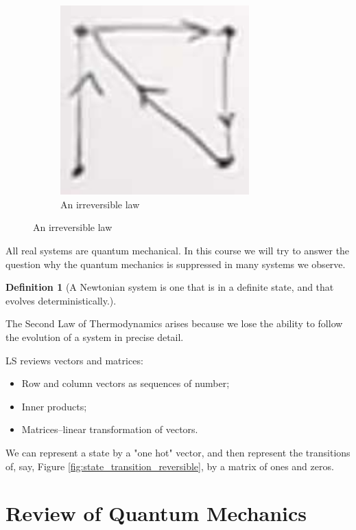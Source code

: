 \documentclass[]{article}
\newtheorem{defn}[thm]{Definition}
\begin{document}
\begin{figure}[H]
\begin{subfigure}[t]{0.45\textwidth}
	\end{subfigure}
	\begin{subfigure}[t]{0.45\textwidth}
		\caption{An irreversible law}
		\includegraphics[width=0.8\textwidth]{et-1-2}
	\end{subfigure}
\end{figure}

All real systems are quantum mechanical. In this course we will try to answer the question why the quantum mechanics is suppressed in many systems we observe.

\begin{defn}[A Newtonian system is one that is in a definite state, and that evolves deterministically.]
\end{defn}

The Second Law of Thermodynamics arises because we lose the ability to follow the evolution of a system in precise detail.

LS reviews vectors and matrices:
\begin{itemize}
	\item Row and column vectors as sequences of number;
	\item Inner products;
	\item Matrices--linear transformation of vectors.
\end{itemize}

We can represent a state by a "one hot" vector, and then represent the transitions of, say, Figure \ref{fig:state_transition_reversible}, by a matrix of ones and zeros.

\section{Review of Quantum Mechanics}
\end{document}
